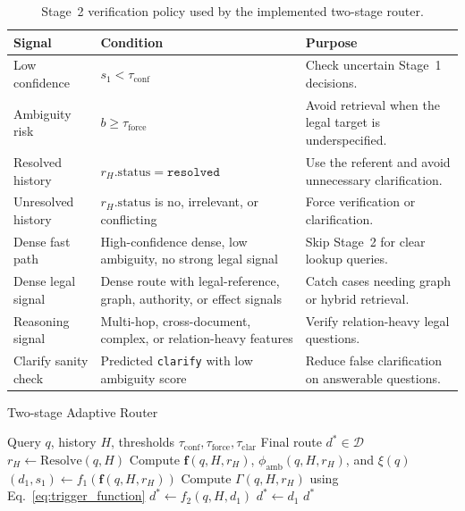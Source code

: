 \documentclass[11pt,twocolumn]{article}
\begin{document}
\begin{table}[!htbp]
\centering
\caption{Stage~2 verification policy used by the implemented two-stage router.}
\label{tab:stage2_policy}
\scriptsize
\setlength{\tabcolsep}{1.8pt}
\renewcommand{\arraystretch}{0.96}
\begin{tabularx}{\columnwidth}{L{2.15cm}L{3.35cm}Y}
\toprule
\textbf{Signal} & \textbf{Condition} & \textbf{Purpose} \\
\midrule
Low confidence &
$s_1 < \tau_{\mathrm{conf}}$ &
Check uncertain Stage~1 decisions. \\
Ambiguity risk &
$b \ge \tau_{\mathrm{force}}$ &
Avoid retrieval when the legal target is underspecified. \\
Resolved history &
$r_H.\mathrm{status}=\texttt{resolved}$ &
Use the referent and avoid unnecessary clarification. \\
Unresolved history &
$r_H.\mathrm{status}$ is no, irrelevant, or conflicting &
Force verification or clarification. \\
Dense fast path &
High-confidence dense, low ambiguity, no strong legal signal &
Skip Stage~2 for clear lookup queries. \\
Dense legal signal &
Dense route with legal-reference, graph, authority, or effect signals &
Catch cases needing graph or hybrid retrieval. \\
Reasoning signal &
Multi-hop, cross-document, complex, or relation-heavy features &
Verify relation-heavy legal questions. \\
Clarify sanity check &
Predicted \texttt{clarify} with low ambiguity score &
Reduce false clarification on answerable questions. \\
\bottomrule
\end{tabularx}
\end{table}

\begin{algorithm}[!htbp]
\caption{Two-stage Adaptive Router}
\label{alg:two_stage_router}
\begin{algorithmic}[1]
\Require Query $q$, history $H$, thresholds $\tau_{\mathrm{conf}},\tau_{\mathrm{force}},\tau_{\mathrm{clar}}$
\Ensure Final route $d^*\in\mathcal{D}$
\State $r_H\leftarrow\mathrm{Resolve}(q,H)$
\State Compute $\mathbf{f}(q,H,r_H)$, $\phi_{\mathrm{amb}}(q,H,r_H)$, and $\xi(q)$
\State $(d_1,s_1)\leftarrow f_1(\mathbf{f}(q,H,r_H))$
\State Compute $\Gamma(q,H,r_H)$ using Eq.~\eqref{eq:trigger_function}
  \State $d^*\leftarrow f_2(q,H,d_1)$
\Else
  \State $d^*\leftarrow d_1$
\EndIf
\State \Return $d^*$
\end{algorithmic}
\end{algorithm}
\end{document}

